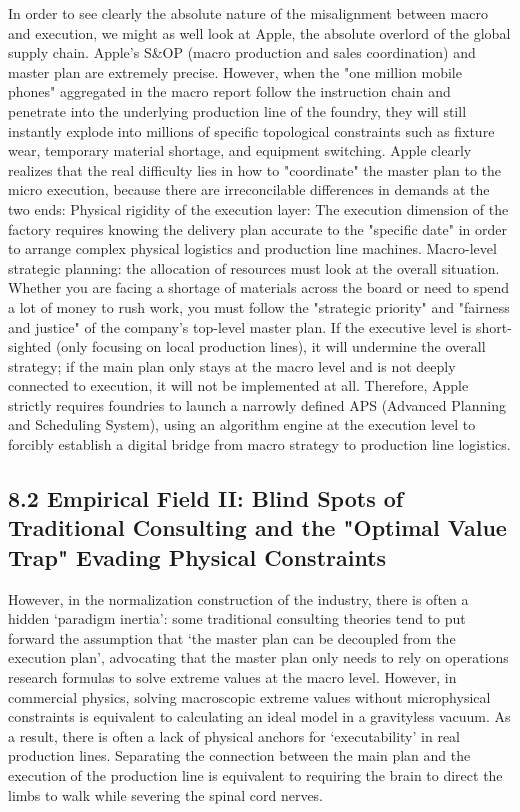 \documentclass[11pt,a4paper]{article}
\begin{document}
In order to see clearly the absolute nature of the misalignment between macro and execution, we might as well look at Apple, the absolute overlord of the global supply chain. Apple's S\&OP (macro production and sales coordination) and master plan are extremely precise. However, when the "one million mobile phones" aggregated in the macro report follow the instruction chain and penetrate into the underlying production line of the foundry, they will still instantly explode into millions of specific topological constraints such as fixture wear, temporary material shortage, and equipment switching. Apple clearly realizes that the real difficulty lies in how to "coordinate" the master plan to the micro execution, because there are irreconcilable differences in demands at the two ends: Physical rigidity of the execution layer: The execution dimension of the factory requires knowing the delivery plan accurate to the "specific date" in order to arrange complex physical logistics and production line machines. Macro-level strategic planning: the allocation of resources must look at the overall situation. Whether you are facing a shortage of materials across the board or need to spend a lot of money to rush work, you must follow the "strategic priority" and "fairness and justice" of the company's top-level master plan. If the executive level is short-sighted (only focusing on local production lines), it will undermine the overall strategy; if the main plan only stays at the macro level and is not deeply connected to execution, it will not be implemented at all. Therefore, Apple strictly requires foundries to launch a narrowly defined APS (Advanced Planning and Scheduling System), using an algorithm engine at the execution level to forcibly establish a digital bridge from macro strategy to production line logistics.


\subsection*{8.2 Empirical Field II: Blind Spots of Traditional Consulting and the "Optimal Value Trap" Evading Physical Constraints}


However, in the normalization construction of the industry, there is often a hidden ‘paradigm inertia’: some traditional consulting theories tend to put forward the assumption that ‘the master plan can be decoupled from the execution plan’, advocating that the master plan only needs to rely on operations research formulas to solve extreme values at the macro level. However, in commercial physics, solving macroscopic extreme values without microphysical constraints is equivalent to calculating an ideal model in a gravityless vacuum. As a result, there is often a lack of physical anchors for ‘executability’ in real production lines. Separating the connection between the main plan and the execution of the production line is equivalent to requiring the brain to direct the limbs to walk while severing the spinal cord nerves.
\end{document}
